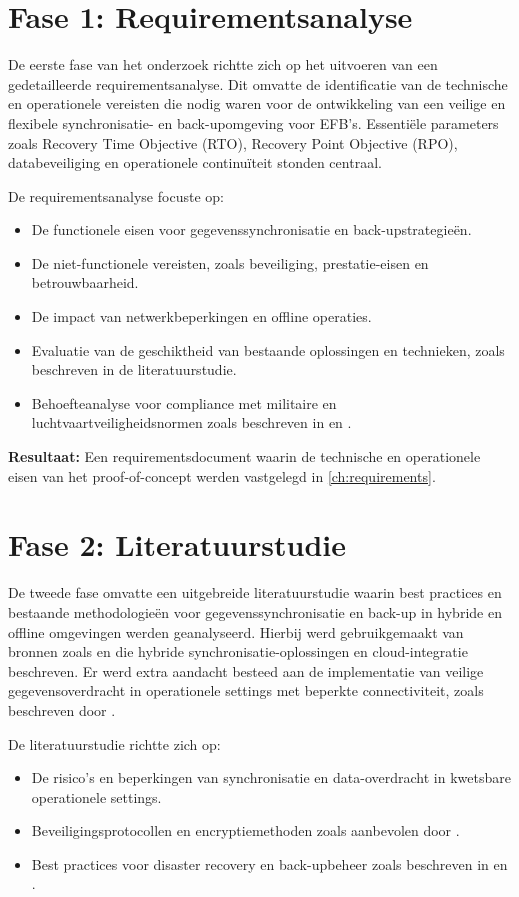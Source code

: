 \section{Fase 1: Requirementsanalyse}
De eerste fase van het onderzoek richtte zich op het uitvoeren van een gedetailleerde requirementsanalyse. Dit omvatte de identificatie van de technische en operationele vereisten die nodig waren voor de ontwikkeling van een veilige en flexibele synchronisatie- en back-upomgeving voor EFB's. Essentiële parameters zoals Recovery Time Objective (RTO), Recovery Point Objective (RPO), databeveiliging en operationele continuïteit stonden centraal.

De requirementsanalyse focuste op:
\begin{itemize}
    \item De functionele eisen voor gegevenssynchronisatie en back-upstrategieën.
    \item De niet-functionele vereisten, zoals beveiliging, prestatie-eisen en betrouwbaarheid.
    \item De impact van netwerkbeperkingen en offline operaties.
    \item Evaluatie van de geschiktheid van bestaande oplossingen en technieken, zoals beschreven in de literatuurstudie.
    \item Behoefteanalyse voor compliance met militaire en luchtvaartveiligheidsnormen zoals beschreven in \textcite{ACISAPGSECVEIL001} en \textcite{FAA_AC91-78A}.
\end{itemize}

\textbf{Resultaat:} Een requirementsdocument waarin de technische en operationele eisen van het proof-of-concept werden vastgelegd in \autoref{ch:requirements}.

\section{Fase 2: Literatuurstudie}
De tweede fase omvatte een uitgebreide literatuurstudie waarin best practices en bestaande methodologieën voor gegevenssynchronisatie en back-up in hybride en offline omgevingen werden geanalyseerd. Hierbij werd gebruikgemaakt van bronnen zoals \textcite{Yanamala2024} en \textcite{VinayakBhuvi} die hybride synchronisatie-oplossingen en cloud-integratie beschreven. Er werd extra aandacht besteed aan de implementatie van veilige gegevensoverdracht in operationele settings met beperkte connectiviteit, zoals beschreven door \textcite{SkybraryEFB}.

De literatuurstudie richtte zich op:
\begin{itemize}
    \item De risico’s en beperkingen van synchronisatie en data-overdracht in kwetsbare operationele settings.
    \item Beveiligingsprotocollen en encryptiemethoden zoals aanbevolen door \textcite{NISTFIPS140}.
    \item Best practices voor disaster recovery en back-upbeheer zoals beschreven in \textcite{VeeamRTO} en \textcite{MicrosoftBackup}.
\end{itemize}

